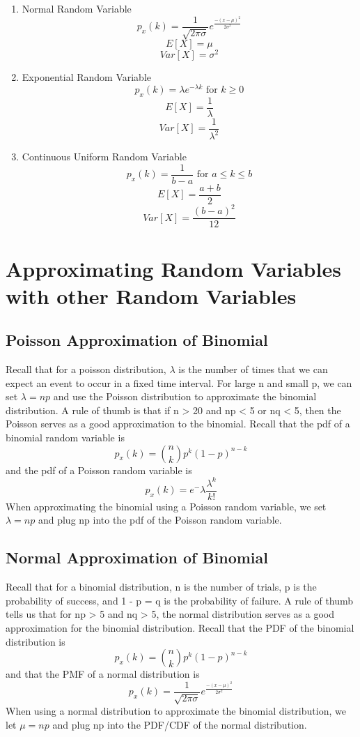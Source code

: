 \documentclass{article}
\begin{document}
\begin{enumerate}
    \item Normal Random Variable \\
    $$p_x(k) = \frac{1}{\sqrt{2\pi\sigma}}e^{\frac{-(x - \mu)^2}{2\sigma^2}}$$
    $$E[X] = \mu$$
    $$Var[X] = \sigma^2$$
    \item Exponential Random Variable \\
    $$p_x(k) = \lambda e^{-\lambda k} \text{ for } k \ge 0$$
    $$E[X] = \frac{1}{\lambda}$$
    $$Var[X] = \frac{1}{\lambda^2}$$
    \item Continuous Uniform Random Variable \\
    $$p_x(k) = \frac{1}{b-a} \text{  for } a \leq k \leq b$$
    $$E[X] = \frac{a+b}{2}$$
    $$Var[X] = \frac{(b-a)^2}{12}$$
\end{enumerate}

\section{Approximating Random Variables with other Random Variables}

\subsection{Poisson Approximation of Binomial}
Recall that for a poisson distribution, $\lambda$ is the number of times that we can expect an event to occur in a fixed time interval. For large n and small p, we can set $\lambda = np$ and use the Poisson distribution to approximate the binomial distribution. A rule of thumb is that if n > 20 and np < 5 or nq < 5, then the Poisson serves as a good approximation to the binomial. Recall that the pdf of a binomial random variable is
$$p_x(k) = {n \choose k}p^k(1-p)^{n-k}$$
and the pdf of a Poisson random variable is 
$$p_x(k) = e^-\lambda\frac{\lambda^k}{k!}$$
When approximating the binomial using a Poisson random variable, we set $\lambda = np$ and plug np into the pdf of the Poisson random variable.


\subsection{Normal Approximation of Binomial}
Recall that for a binomial distribution, n is the number of trials, p is the probability of success, and 1 - p = q is the probability of failure. A rule of thumb tells us that for np > 5 and nq > 5, the normal distribution serves as a good approximation for the binomial distribution. Recall that the PDF of the binomial distribution is
$$p_x(k) = {n \choose k}p^k(1-p)^{n-k}$$
and that the PMF of a normal distribution is
$$p_x(k) = \frac{1}{\sqrt{2\pi\sigma}}e^{\frac{-(x - \mu)^2}{2\sigma^2}}$$
When using a normal distribution to approximate the binomial distribution, we let $\mu = np$ and plug np into the PDF/CDF of the normal distribution.
\end{document}
